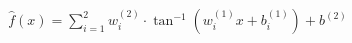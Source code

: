 \documentclass[preview]{standalone}
\begin{document}
\begin{align*}
\hat{f}(x) = \sum_{i=1}^{2} w^{(2)}_i \cdot \tan^{-1} \left( w^{(1)}_i x + b^{(1)}_i \right) + b^{(2)}
\end{align*}
\end{document}
